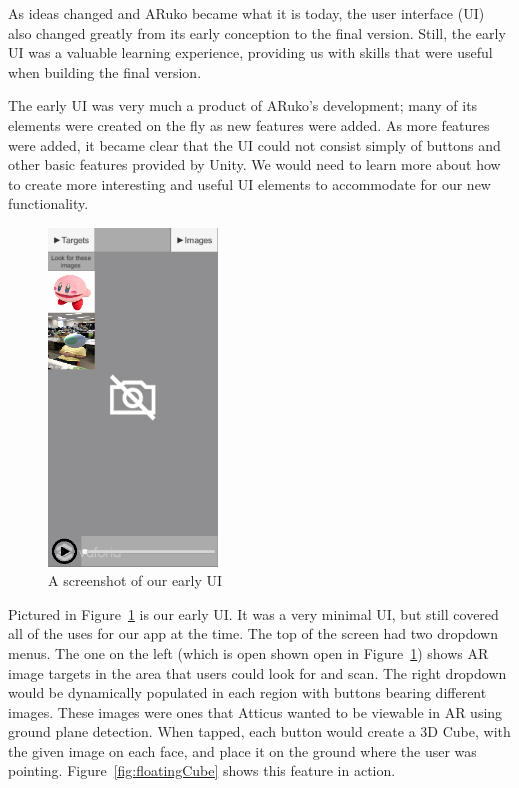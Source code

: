 \documentclass[a4paper, 10pt, american, titlepage]{article}
\begin{document}
As ideas changed and ARuko became what it is today, the user interface (UI) also
changed greatly from its early conception to the final version. Still, the early
UI was a valuable learning experience, providing us with skills that were useful
when building the final version.

The early UI was very much a product of ARuko's development; many of its
elements were created on the fly as new features were added. As more features
were added, it became clear that the UI could not consist simply of buttons and
other basic features provided by Unity. We would need to learn more about how to
create more interesting and useful UI elements to accommodate for our new
functionality.

\begin{figure}[h]
	\centering
	\includegraphics[width=0.4\textwidth]{old-ui.png}
	\caption{A screenshot of our early UI}
	\label{fig:oldUI}
\end{figure}

Pictured in Figure~\ref{fig:oldUI} is our early UI. It was a very minimal UI,
but still covered all of the uses for our app at the time. The top of the screen
had two dropdown menus. The one on the left (which is open shown open in
Figure~\ref{fig:oldUI}) shows AR image targets in the area that users could
look for and scan. The right dropdown would be dynamically populated in each
region with buttons bearing different images. These images were ones that
Atticus wanted to be viewable in AR using ground plane detection. When tapped,
each button would create a 3D Cube, with the given image on each face, and place
it on the ground where the user was pointing. Figure~\ref{fig:floatingCube}
shows this feature in action.
\end{document}
